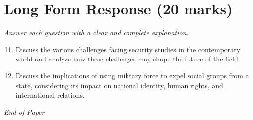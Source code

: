 \documentclass[12pt]{article}
\begin{document}
\section*{Long Form Response (20 marks)}
\textit{Answer each question with a clear and complete explanation.}
\begin{enumerate}[label=\arabic*.]
\setcounter{enumi}{10}
\item Discuss the various challenges facing security studies in the contemporary world and analyze how these challenges may shape the future of the field.
\item Discuss the implications of using military force to expel social groups from a state, considering its impact on national identity, human rights, and international relations.
\end{enumerate}

\vfill
\noindent\textit{End of Paper}
\end{document}
